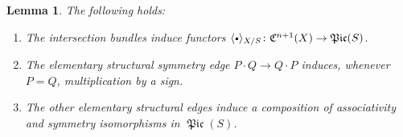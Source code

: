 \documentclass[JEP,XML,SOM,Unicode,published]{cedram}
\newcommand{\sbullet}{{\scriptscriptstyle\bullet}}
\newcommand{\csbullet}{{\raisebox{1pt}{$\sbullet$}}}
\theoremstyle{plain}
\newtheorem{lemma}[theorem]{Lemma}
\theoremstyle{definition}
\newcommand{\Cfrak}{\mathfrak C}
\DeclareMathOperator{\Picfr}{\mathfrak{Pic}}
\begin{document}
\begin{lemma}\label{lemma:Elkik-functor-free-category}
The following holds:
\begin{enumerate}
\item\label{item:Elkik-functor-free-category-1} The intersection bundles induce functors $\langle\csbullet\rangle_{X/S}\colon\Cfrak^{n+1}(X) \to \Picfr(S)$.
\item\label{item:Elkik-functor-free-category-2} The elementary structural symmetry edge $P \cdot Q \to Q \cdot P$ induces, whenever $P =Q$, multiplication by a sign.
\item\label{item:Elkik-functor-free-category-3} The other elementary structural edges induce a composition of associativity and symmetry isomorphisms in $\Picfr(S)$.
\end{enumerate}
\end{lemma}
\end{document}

